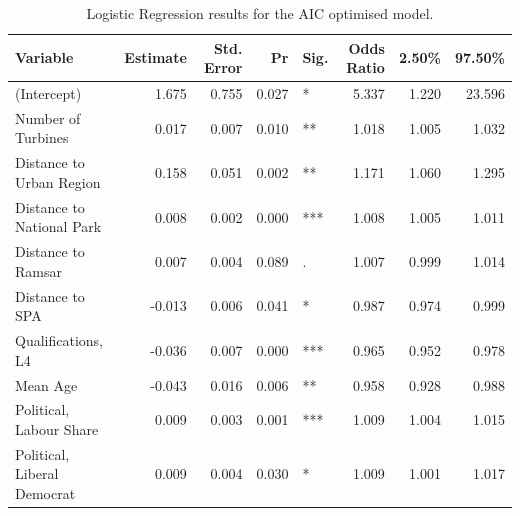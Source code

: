 \documentclass[a4paper,]{article}
\theoremstyle{definition}
\theoremstyle{definition}
\theoremstyle{definition}
\theoremstyle{remark}
\begin{document}
\begin{table}

\caption{\label{tab:LogisticResults}Logistic Regression results for the AIC optimised model.}
\centering
\begin{tabular}[t]{lrrrlrrr}
\toprule
Variable & Estimate & Std. Error & Pr & Sig. & Odds Ratio & 2.50\% & 97.50\%\\
\midrule
(Intercept) & 1.675 & 0.755 & 0.027 & * & 5.337 & 1.220 & 23.596\\
Number of Turbines & 0.017 & 0.007 & 0.010 & ** & 1.018 & 1.005 & 1.032\\
Distance to  Urban Region & 0.158 & 0.051 & 0.002 & ** & 1.171 & 1.060 & 1.295\\
Distance to National Park & 0.008 & 0.002 & 0.000 & *** & 1.008 & 1.005 & 1.011\\
Distance to Ramsar & 0.007 & 0.004 & 0.089 & . & 1.007 & 0.999 & 1.014\\
\addlinespace
Distance to SPA & -0.013 & 0.006 & 0.041 & * & 0.987 & 0.974 & 0.999\\
Qualifications, L4 & -0.036 & 0.007 & 0.000 & *** & 0.965 & 0.952 & 0.978\\
Mean Age & -0.043 & 0.016 & 0.006 & ** & 0.958 & 0.928 & 0.988\\
Political, Labour Share & 0.009 & 0.003 & 0.001 & *** & 1.009 & 1.004 & 1.015\\
Political, Liberal Democrat & 0.009 & 0.004 & 0.030 & * & 1.009 & 1.001 & 1.017\\
\bottomrule
\end{tabular}
\end{table}

\begin{table}[!h]

\caption{\label{tab:LogisticModelComparison}A summary of the hierarchical logistic regression models}
\centering
{}
\end{table}
\end{document}
